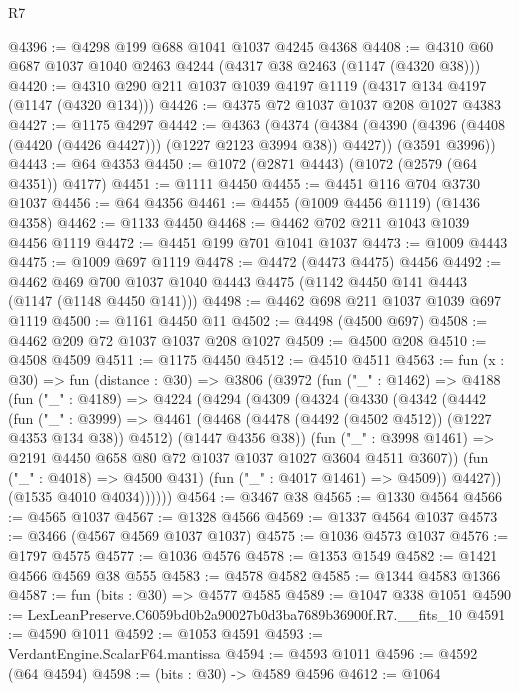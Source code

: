 \begin{lexlean}{R7}
\begin{coremodule}
@4396 := @4298 @199 @688 @1041 @1037 @4245 @4368
@4408 := @4310 @60 @687 @1037 @1040 @2463 @4244 (@4317 @38 @2463 (@1147 (@4320 @38)))
@4420 := @4310 @290 @211 @1037 @1039 @4197 @1119 (@4317 @134 @4197 (@1147 (@4320 @134)))
@4426 := @4375 @72 @1037 @1037 @208 @1027 @4383
@4427 := @1175 @4297
@4442 := @4363
    (@4374
      (@4384 (@4390 (@4396 (@4408 (@4420 (@4426 @4427))) (@1227 @2123 @3994 @38)) @4427))
      (@3591 @3996))
@4443 := @64 @4353
@4450 := @1072 (@2871 @4443) (@1072 (@2579 (@64 @4351)) @4177)
@4451 := @1111 @4450
@4455 := @4451 @116 @704 @3730 @1037
@4456 := @64 @4356
@4461 := @4455 (@1009 @4456 @1119) (@1436 @4358)
@4462 := @1133 @4450
@4468 := @4462 @702 @211 @1043 @1039 @4456 @1119
@4472 := @4451 @199 @701 @1041 @1037
@4473 := @1009 @4443
@4475 := @1009 @697 @1119
@4478 := @4472 (@4473 @4475) @4456
@4492 := @4462 @469 @700 @1037 @1040 @4443 @4475 (@1142 @4450 @141 @4443 (@1147 (@1148 @4450 @141)))
@4498 := @4462 @698 @211 @1037 @1039 @697 @1119
@4500 := @1161 @4450 @11
@4502 := @4498 (@4500 @697)
@4508 := @4462 @209 @72 @1037 @1037 @208 @1027
@4509 := @4500 @208
@4510 := @4508 @4509
@4511 := @1175 @4450
@4512 := @4510 @4511
@4563 := fun (x : @30) =>
  fun (distance : @30) =>
  @3806
    (@3972
      (fun ("_" : @1462) =>
      @4188
        (fun ("_" : @4189) =>
        @4224
          (@4294
            (@4309
              (@4324
                (@4330
                  (@4342
                    (@4442
                      (fun ("_" : @3999) =>
                      @4461
                        (@4468 (@4478 (@4492 (@4502 @4512)) (@1227 @4353 @134 @38)) @4512)
                        (@1447 @4356 @38))
                      (fun ("_" : @3998 @1461) =>
                      @2191 @4450 @658 @80 @72 @1037 @1037 @1027 @3604 @4511 @3607))
                    (fun ("_" : @4018) => @4500 @431)
                    (fun ("_" : @4017 @1461) => @4509))
                  @4427))
              (@1535 @4010 @4034))))))
@4564 := @3467 @38
@4565 := @1330 @4564
@4566 := @4565 @1037
@4567 := @1328 @4566
@4569 := @1337 @4564 @1037
@4573 := @3466 (@4567 @4569 @1037 @1037)
@4575 := @1036 @4573 @1037
@4576 := @1797 @4575
@4577 := @1036 @4576
@4578 := @1353 @1549
@4582 := @1421 @4566 @4569 @38 @555
@4583 := @4578 @4582
@4585 := @1344 @4583 @1366
@4587 := fun (bits : @30) => @4577 @4585
@4589 := @1047 @338 @1051
@4590 := LexLeanPreserve.C6059bd0b2a90027b0d3ba7689b36900f.R7.__fits_10
@4591 := @4590 @1011
@4592 := @1053 @4591
@4593 := VerdantEngine.ScalarF64.mantissa
@4594 := @4593 @1011
@4596 := @4592 (@64 @4594)
@4598 := (bits : @30) -> @4589 @4596
@4612 := @1064

\end{coremodule}
\end{lexlean}

